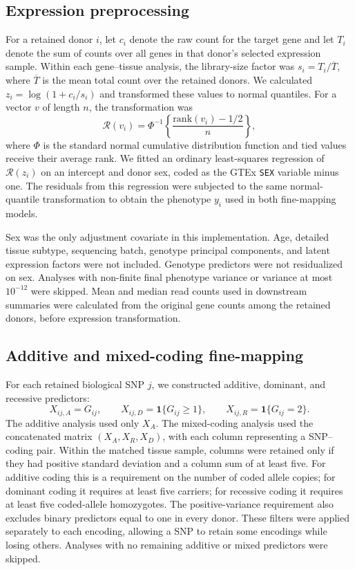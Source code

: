 \documentclass[12pt]{article}
\begin{document}
\subsection{Expression preprocessing}
For a retained donor $i$, let $c_i$ denote the raw count for the target gene
and let $T_i$ denote the sum of counts over all genes in that donor's selected
expression sample. Within each gene--tissue analysis, the library-size factor
was $s_i=T_i/\overline{T}$, where $\overline{T}$ is the mean total count over
the retained donors. We calculated $z_i=\log(1+c_i/s_i)$ and transformed
these values to normal quantiles. For a vector $v$ of length $n$, the
transformation was
\begin{equation}
 \mathcal{R}(v_i)=\Phi^{-1}\left\{\frac{\mathrm{rank}(v_i)-1/2}{n}\right\},
\end{equation}
where $\Phi$ is the standard normal cumulative distribution function and
tied values receive their average rank. We fitted an ordinary least-squares
regression of $\mathcal{R}(z_i)$ on an intercept and donor sex, coded as the
GTEx \texttt{SEX} variable minus one. The residuals from this regression
were subjected to the same normal-quantile transformation to obtain the
phenotype $y_i$ used in both fine-mapping models.

Sex was the only adjustment covariate in this implementation. Age, detailed
tissue subtype, sequencing batch, genotype principal components, and latent
expression factors were not included. Genotype predictors were not
residualized on sex. Analyses with non-finite final phenotype variance or
variance at most $10^{-12}$ were skipped. Mean and median read counts used
in downstream summaries were calculated from the original gene counts
among the retained donors, before expression transformation.

\subsection{Additive and mixed-coding fine-mapping}
For each retained biological SNP $j$, we constructed additive, dominant,
and recessive predictors:
\begin{equation}
 X_{ij,A}=G_{ij},\qquad
 X_{ij,D}=\mathbf{1}\{G_{ij}\geq 1\},\qquad
 X_{ij,R}=\mathbf{1}\{G_{ij}=2\}.
\end{equation}
The additive analysis used only $X_A$. The mixed-coding analysis used the
concatenated matrix $(X_A,X_R,X_D)$, with each column representing a
SNP--coding pair. Within the matched tissue sample, columns were retained
only if they had positive standard deviation and a column sum of at least
five. For additive coding this is a requirement on the number of coded
allele copies; for dominant coding it requires at least five carriers;
for recessive coding it requires at least five coded-allele homozygotes.
The positive-variance requirement also excludes binary predictors equal
to one in every donor. These filters were applied separately to each
encoding, allowing a SNP to retain some encodings while losing others.
Analyses with no remaining additive or mixed predictors were skipped.
\end{document}
